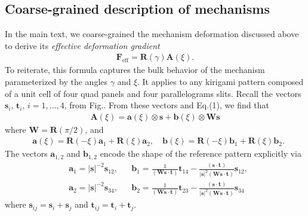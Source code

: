 \documentclass[aps,11pt,tightenlines,notitlepage,superscriptaddress,longbibliography,nofootinbib]{revtex4-1}
\begin{document}
\subsection{Coarse-grained description of mechanisms} In the main text, we coarse-grained the mechanism deformation discussed above to derive its \textit{effective deformation gradient} 
\begin{equation}
    \begin{aligned}
    \mathbf{F}_{\text{eff}} = \mathbf{R}(\gamma) \mathbf{A}(\xi).
    \end{aligned}
\end{equation}
To reiterate, this formula captures the bulk behavior of the mechanism  parameterized by the angles $\gamma$ and $\xi$. It applies to any kirigami pattern composed of a unit cell of four quad panels and four parallelograms slits. Recall the vectors $\mathbf{s}_i$, $\mathbf{t}_i$, $i = 1,\ldots,4$, from Fig..  From these vectors and Eq.\;(1), we find that 
\begin{equation}
    \begin{aligned}\label{eq:AxiExplicit}
    \mathbf{A}(\xi) = \mathbf{a}(\xi) \otimes \mathbf{s} + \mathbf{b}(\xi) \otimes \mathbf{W} \mathbf{s}
    \end{aligned}
\end{equation}
where $\mathbf{W} = \mathbf{R}(\pi/2)$, and 
\begin{equation}
\begin{aligned}\label{eq:abKin}
&\mathbf{a}(\xi) = \mathbf{R}(-\xi) \mathbf{a}_1 + \mathbf{R}(\xi) \mathbf{a}_2, \quad \mathbf{b}(\xi) = \mathbf{R}(-\xi) \mathbf{b}_1 + \mathbf{R}(\xi) \mathbf{b}_2.
\end{aligned}
\end{equation}
The vectors $\mathbf{a}_{1,2}$ and $\mathbf{b}_{1,2}$ encode the shape of the reference pattern explicitly via
\begin{equation}
\begin{aligned}\label{eq:abShape}
&\mathbf{a}_1 = |\mathbf{s}|^{-2} \mathbf{s}_{12}, && \mathbf{b}_1 =   \tfrac{1}{ (\mathbf{W} \mathbf{s} \cdot \mathbf{t})} \mathbf{t}_{14}    - \tfrac{(\mathbf{s} \cdot \mathbf{t})}{|\mathbf{s}|^2 (\mathbf{W} \mathbf{s} \cdot \mathbf{t})} \mathbf{s}_{12},  \\
&\mathbf{a}_2 = |\mathbf{s}|^{-2} \mathbf{s}_{34}, 
&& \mathbf{b}_2 =   \tfrac{1}{ (\mathbf{W} \mathbf{s} \cdot \mathbf{t})} \mathbf{t}_{23}    - \tfrac{(\mathbf{s} \cdot \mathbf{t})}{|\mathbf{s}|^2 (\mathbf{W} \mathbf{s} \cdot \mathbf{t})} \mathbf{s}_{34}
\end{aligned}
\end{equation} 
where $\mathbf{s}_{ij} = \mathbf{s}_i + \mathbf{s}_j$ and $\mathbf{t}_{ij} = \mathbf{t}_i + \mathbf{t}_j$. 
\end{document}
